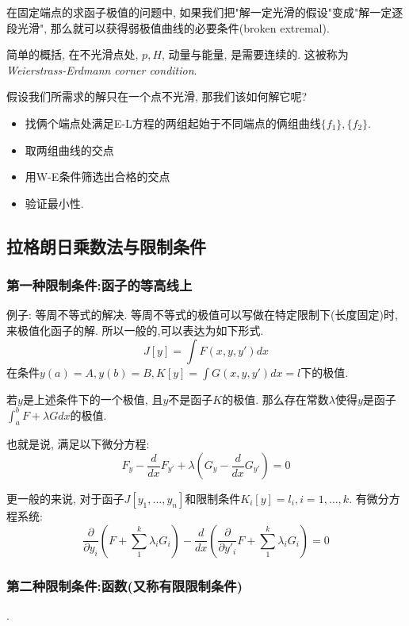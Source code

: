 在固定端点的求函子极值的问题中,
如果我们把"解一定光滑的假设"变成"解一定逐段光滑",
那么就可以获得弱极值曲线的必要条件(broken extremal).

简单的概括, 在不光滑点处, \(p, H\), 动量与能量, 是需要连续的.
这被称为\emph{Weierstrass-Erdmann corner condition}.

假设我们所需求的解只在一个点不光滑, 那我们该如何解它呢?
\begin{itemize}
    \item 找俩个端点处满足E-L方程的两组起始于不同端点的俩组曲线\(\{f_1\},\{f_2\} \).
    \item 取两组曲线的交点
    \item 用W-E条件筛选出合格的交点
    \item 验证最小性.
\end{itemize}



\subsection{拉格朗日乘数法与限制条件}

\subsubsection{第一种限制条件:函子的等高线上}

例子: 等周不等式的解决. 等周不等式的极值可以写做在特定限制下(长度固定)时,
来极值化函子的解. 所以一般的,可以表达为如下形式.
\[J[y] = \int F(x,y,y')dx\]
在条件\(y(a) = A, y(b) = B, K[y] = \int G(x,y,y')dx = l\)下的极值.

\begin{thm}

    若\(y\)是上述条件下的一个极值, 且\(y\)不是函子\(K\)的极值.
    那么存在常数\(\lambda\)使得\(y\)是函子\(\int_a^b F+\lambda G dx\)的极值.

    也就是说, 满足以下微分方程:
    \[F_{y} - \frac{d}{dx}F_{y'} + \lambda(G_y - \frac{d}{dx}G_{y'}) = 0\]

\end{thm}

更一般的来说, 对于函子\(J[y_1,\dots ,y_n]\)和限制条件\(K_i[y] = l_i, i = 1,\dots,k\).
有微分方程系统:
\[\frac{\partial}{\partial y_i}(F + \sum_1^k \lambda_iG_i ) - \frac{d}{dx} (\frac{\partial}{\partial y'_i} F+\sum_1^k \lambda_iG_i) = 0\]

\subsubsection{第二种限制条件:函数(又称有限限制条件)}.

